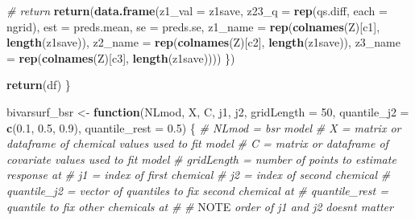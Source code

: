 \documentclass[12pt, twoside]{amherstthesis}
\newenvironment{Shaded}{\begin{snugshade}}{\end{snugshade}}
\newcommand{\AlertTok}[1]{\textcolor[rgb]{0.94,0.16,0.16}{#1}}
\newcommand{\AttributeTok}[1]{\textcolor[rgb]{0.13,0.29,0.53}{#1}}
\newcommand{\CommentTok}[1]{\textcolor[rgb]{0.56,0.35,0.01}{\textit{#1}}}
\newcommand{\ControlFlowTok}[1]{\textcolor[rgb]{0.13,0.29,0.53}{\textbf{#1}}}
\newcommand{\DecValTok}[1]{\textcolor[rgb]{0.00,0.00,0.81}{#1}}
\newcommand{\FloatTok}[1]{\textcolor[rgb]{0.00,0.00,0.81}{#1}}
\newcommand{\FunctionTok}[1]{\textcolor[rgb]{0.13,0.29,0.53}{\textbf{#1}}}
\newcommand{\NormalTok}[1]{#1}
\newcommand{\OtherTok}[1]{\textcolor[rgb]{0.56,0.35,0.01}{#1}}
\begin{document}
\begin{Shaded}
\begin{Highlighting}[]
    \CommentTok{\# return}
    \FunctionTok{return}\NormalTok{(}\FunctionTok{data.frame}\NormalTok{(}\AttributeTok{z1\_val =}\NormalTok{ z1save, }
                      \AttributeTok{z23\_q =} \FunctionTok{rep}\NormalTok{(qs.diff, }\AttributeTok{each =}\NormalTok{ ngrid), }
                      \AttributeTok{est =}\NormalTok{ preds.mean, }
                      \AttributeTok{se =}\NormalTok{ preds.se, }
                      \AttributeTok{z1\_name =} \FunctionTok{rep}\NormalTok{(}\FunctionTok{colnames}\NormalTok{(Z)[c1], }\FunctionTok{length}\NormalTok{(z1save)), }
                      \AttributeTok{z2\_name =} \FunctionTok{rep}\NormalTok{(}\FunctionTok{colnames}\NormalTok{(Z)[c2], }\FunctionTok{length}\NormalTok{(z1save)), }
                      \AttributeTok{z3\_name =} \FunctionTok{rep}\NormalTok{(}\FunctionTok{colnames}\NormalTok{(Z)[c3], }\FunctionTok{length}\NormalTok{(z1save))))}
\NormalTok{  \})}
  
  \FunctionTok{return}\NormalTok{(df)}
\NormalTok{\}}

\NormalTok{bivarsurf\_bsr }\OtherTok{\textless{}{-}} \ControlFlowTok{function}\NormalTok{(NLmod, X, C, j1, j2, }\AttributeTok{gridLength =} \DecValTok{50}\NormalTok{, }
                          \AttributeTok{quantile\_j2 =} \FunctionTok{c}\NormalTok{(}\FloatTok{0.1}\NormalTok{, }\FloatTok{0.5}\NormalTok{, }\FloatTok{0.9}\NormalTok{), }\AttributeTok{quantile\_rest =} \FloatTok{0.5}\NormalTok{) \{}
  \CommentTok{\#\textquotesingle{} NLmod = bsr model}
  \CommentTok{\#\textquotesingle{} X = matrix or dataframe of chemical values used to fit model}
  \CommentTok{\#\textquotesingle{} C = matrix or dataframe of covariate values used to fit model}
  \CommentTok{\#\textquotesingle{} gridLength = number of points to estimate response at}
  \CommentTok{\#\textquotesingle{} j1 = index of first chemical}
  \CommentTok{\#\textquotesingle{} j2 = index of second chemical}
  \CommentTok{\#\textquotesingle{} quantile\_j2 = vector of quantiles to fix second chemical at}
  \CommentTok{\#\textquotesingle{} quantile\_rest = quantile to fix other chemicals at}
  \CommentTok{\#\textquotesingle{} }
  \CommentTok{\#\textquotesingle{} }\AlertTok{NOTE}\CommentTok{ order of j1 and j2 doesn\textquotesingle{}t matter}
  

\end{Highlighting}
\end{Shaded}
\end{document}
